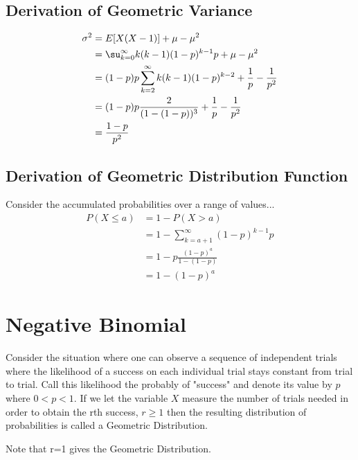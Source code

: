 \documentclass[10pt,]{book}
\theoremstyle{plain}
\theoremstyle{definition}
\theoremstyle{definition}
\theoremstyle{definition}
\numberwithin{equation}{section}
\newcommand{\lt}{ < }
\newcommand{\gt}{ > }
\begin{document}
\subsection[Derivation of Geometric Variance]{Derivation of Geometric Variance}\label{subsection-22}
\begin{align*}
\sigma^2 & = E[X(X-1)] + \mu - \mu^2 \\
 & = \su _{k=0}^{\infty} {k(k-1)(1-p)^{k-1}p} + \mu - \mu^2 \\
 & = (1-p)p \sum_{k=2}^{\infty} {k(k-1)(1-p)^{k-2}} + \frac{1}{p} - \frac{1}{p^2}\\
 & = (1-p)p \frac{2}{(1-(1-p))^3} + \frac{1}{p} - \frac{1}{p^2}\\
 & = \frac{1-p}{p^2}
\end{align*}\typeout{************************************************}
\typeout{************************************************}
\subsection[Derivation of Geometric Distribution Function]{Derivation of Geometric Distribution Function}\label{subsection-23}
 Consider the accumulated probabilities over a range of values...%
\begin{align*}
 P(X \le a) & = 1 - P(X \gt a)\\
 & = 1- \sum_{k={a+1}}^{\infty} {(1-p)^{k-1}p}\\
 & = 1- p \frac{(1-p)^{a}}{1-(1-p)}\\
 & = 1- (1-p)^{a}
\end{align*}\typeout{************************************************}
\typeout{************************************************}
\section[Negative Binomial]{Negative Binomial}\label{section-32}
Consider the situation where one can observe a sequence  of independent
	trials where the likelihood of a success on each individual trial
	stays constant from trial to trial. Call this likelihood the probably of
	"success" and denote its value by \(p\) 
	where \( 0 \lt p \lt 1 \).  
	If we let the variable \(X\) measure the number of trials needed in order
	to obtain the rth success, \(r \ge 1\) 
	then the resulting distribution of probabilities is called a 
	Geometric Distribution.%
\par
Note that r=1 gives the Geometric Distribution.%
\typeout{************************************************}
\typeout{************************************************}
\end{document}
